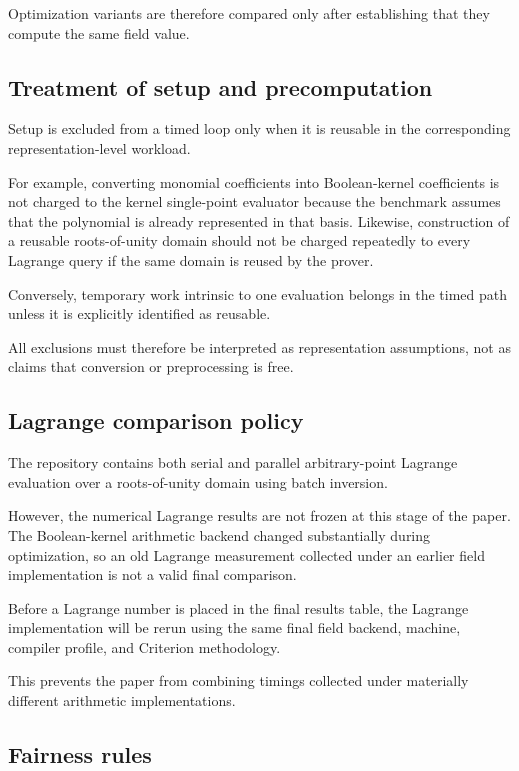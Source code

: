 Optimization variants are therefore compared only after establishing that
they compute the same field value.

\subsection{Treatment of setup and precomputation}

Setup is excluded from a timed loop only when it is reusable in the
corresponding representation-level workload.

For example, converting monomial coefficients into Boolean-kernel
coefficients is not charged to the kernel single-point evaluator because
the benchmark assumes that the polynomial is already represented in that
basis. Likewise, construction of a reusable roots-of-unity domain should
not be charged repeatedly to every Lagrange query if the same domain is
reused by the prover.

Conversely, temporary work intrinsic to one evaluation belongs in the
timed path unless it is explicitly identified as reusable.

All exclusions must therefore be interpreted as representation assumptions,
not as claims that conversion or preprocessing is free.

\subsection{Lagrange comparison policy}

The repository contains both serial and parallel arbitrary-point Lagrange
evaluation over a roots-of-unity domain using batch inversion.

However, the numerical Lagrange results are not frozen at this stage of the
paper. The Boolean-kernel arithmetic backend changed substantially during
optimization, so an old Lagrange measurement collected under an earlier
field implementation is not a valid final comparison.

Before a Lagrange number is placed in the final results table, the Lagrange
implementation will be rerun using the same final field backend, machine,
compiler profile, and Criterion methodology.

This prevents the paper from combining timings collected under materially
different arithmetic implementations.

\subsection{Fairness rules}

